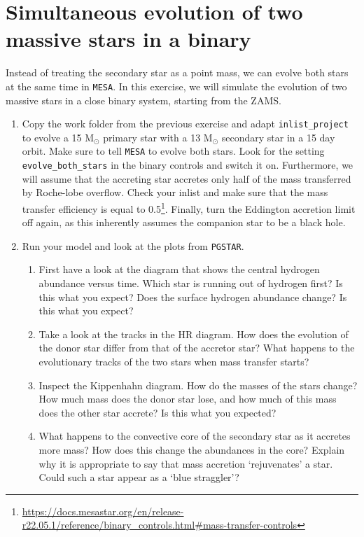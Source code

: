 \documentclass[11pt,a4paper]{article}
\begin{document}
\section{Simultaneous evolution of two massive stars in a binary}

Instead of treating the secondary star as a point mass, we can evolve both stars at the same time in \texttt{MESA}. In this exercise, we will simulate the evolution of two massive stars in a close binary system, starting from the ZAMS.

\begin{enumerate}
\item Copy the work folder from the previous exercise and adapt \verb|inlist_project| to evolve a 15 M$_\odot$ primary star with a 13 M$_\odot$ secondary star in a 15 day orbit. Make sure to tell \texttt{MESA} to evolve both stars. Look for the setting \verb|evolve_both_stars| in the binary controls and switch it on. Furthermore, we will assume that the accreting star accretes only half of the mass transferred by Roche-lobe overflow. Check your inlist and make sure that the mass transfer efficiency is equal to 0.5\footnote{\url{https://docs.mesastar.org/en/release-r22.05.1/reference/binary_controls.html\#mass-transfer-controls}}. Finally, turn the Eddington accretion limit off again, as this inherently assumes the companion star to be a black hole.
\item Run your model and look at the plots from \texttt{PGSTAR}.
\begin{enumerate}
\item First have a look at the diagram that shows the central hydrogen abundance versus time. Which star is running out of hydrogen first? Is this what you expect? Does the surface hydrogen abundance change? Is this what you expect?
\item Take a look at the tracks in the HR diagram. How does the evolution of the donor star differ from that of the accretor star? What happens to the evolutionary tracks of the two stars when mass transfer starts?
\item Inspect the Kippenhahn diagram. How do the masses of the stars change? How much mass does the donor star lose, and how much of this mass does the other star accrete? Is this what you expected? 
\item What happens to the convective core of the secondary star as it accretes more mass? How does this change the abundances in the core? Explain why it is appropriate to say that mass accretion `rejuvenates' a star. Could such a star appear as a `blue straggler'?
\end{enumerate}
\end{enumerate}




\end{document}
